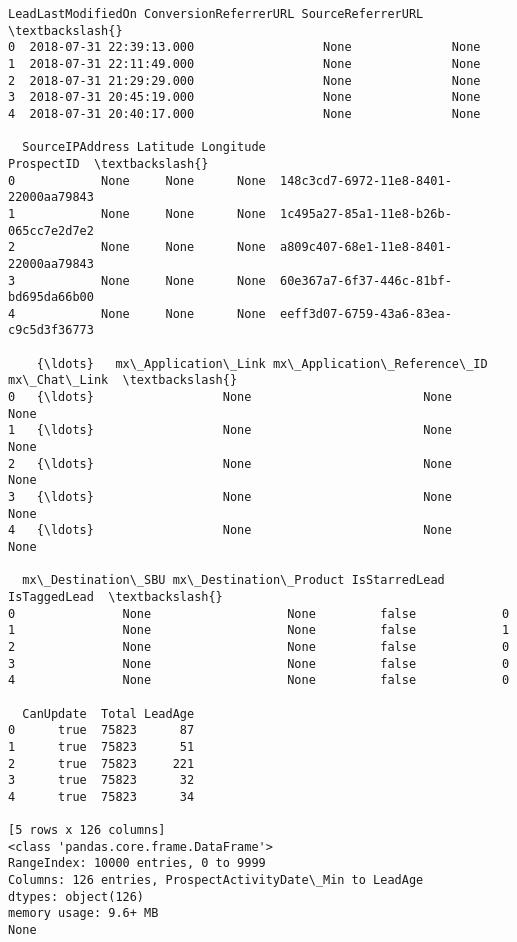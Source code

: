 \documentclass[11pt]{article}
\begin{document}
\begin{Verbatim}[commandchars=\\\{\}]
        LeadLastModifiedOn ConversionReferrerURL SourceReferrerURL  \textbackslash{}
0  2018-07-31 22:39:13.000                  None              None   
1  2018-07-31 22:11:49.000                  None              None   
2  2018-07-31 21:29:29.000                  None              None   
3  2018-07-31 20:45:19.000                  None              None   
4  2018-07-31 20:40:17.000                  None              None   

  SourceIPAddress Latitude Longitude                            ProspectID  \textbackslash{}
0            None     None      None  148c3cd7-6972-11e8-8401-22000aa79843   
1            None     None      None  1c495a27-85a1-11e8-b26b-065cc7e2d7e2   
2            None     None      None  a809c407-68e1-11e8-8401-22000aa79843   
3            None     None      None  60e367a7-6f37-446c-81bf-bd695da66b00   
4            None     None      None  eeff3d07-6759-43a6-83ea-c9c5d3f36773   

    {\ldots}   mx\_Application\_Link mx\_Application\_Reference\_ID mx\_Chat\_Link  \textbackslash{}
0   {\ldots}                  None                        None         None   
1   {\ldots}                  None                        None         None   
2   {\ldots}                  None                        None         None   
3   {\ldots}                  None                        None         None   
4   {\ldots}                  None                        None         None   

  mx\_Destination\_SBU mx\_Destination\_Product IsStarredLead IsTaggedLead  \textbackslash{}
0               None                   None         false            0   
1               None                   None         false            1   
2               None                   None         false            0   
3               None                   None         false            0   
4               None                   None         false            0   

  CanUpdate  Total LeadAge  
0      true  75823      87  
1      true  75823      51  
2      true  75823     221  
3      true  75823      32  
4      true  75823      34  

[5 rows x 126 columns]
<class 'pandas.core.frame.DataFrame'>
RangeIndex: 10000 entries, 0 to 9999
Columns: 126 entries, ProspectActivityDate\_Min to LeadAge
dtypes: object(126)
memory usage: 9.6+ MB
None

    \end{Verbatim}
\end{document}
